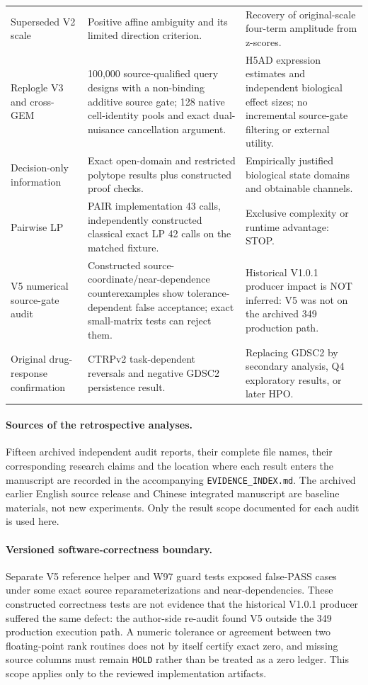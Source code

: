 \begin{longtable}{@{}L{0.22\textwidth}L{0.40\textwidth}L{0.30\textwidth}@{}}
Superseded V2 scale & Positive affine ambiguity and its limited direction criterion. & Recovery of original-scale four-term amplitude from z-scores.\\
Replogle V3 and cross-GEM & 100,000 source-qualified query designs with a non-binding additive source gate; 128 native cell-identity pools and exact dual-nuisance cancellation argument. & H5AD expression estimates and independent biological effect sizes; no incremental source-gate filtering or external utility.\\
Decision-only information & Exact open-domain and restricted polytope results plus constructed proof checks. & Empirically justified biological state domains and obtainable channels.\\
Pairwise LP & PAIR implementation 43 calls, independently constructed classical exact LP 42 calls on the matched fixture. & Exclusive complexity or runtime advantage: STOP.\\
V5 numerical source-gate audit & Constructed source-coordinate/near-dependence counterexamples show tolerance-dependent false acceptance; exact small-matrix tests can reject them. & Historical V1.0.1 producer impact is NOT inferred: V5 was not on the archived 349 production path.\\
Original drug-response confirmation & CTRPv2 task-dependent reversals and negative GDSC2 persistence result. & Replacing GDSC2 by secondary analysis, Q4 exploratory results, or later HPO.\\\bottomrule
\end{longtable}

\paragraph{Sources of the retrospective analyses.} Fifteen archived independent audit reports, their complete file names, their corresponding research claims and the location where each result enters the manuscript are recorded in the accompanying \texttt{EVIDENCE\_INDEX.md}. The archived earlier English source release and Chinese integrated manuscript are baseline materials, not new experiments. Only the result scope documented for each audit is used here.

\paragraph{Versioned software-correctness boundary.} Separate V5 reference helper and W97 guard tests exposed false-PASS cases under some exact source reparameterizations and near-dependencies. These constructed correctness tests are not evidence that the historical V1.0.1 producer suffered the same defect: the author-side re-audit found V5 outside the 349 production execution path. A numeric tolerance or agreement between two floating-point rank routines does not by itself certify exact zero, and missing source columns must remain \texttt{HOLD} rather than be treated as a zero ledger. This scope applies only to the reviewed implementation artifacts.
